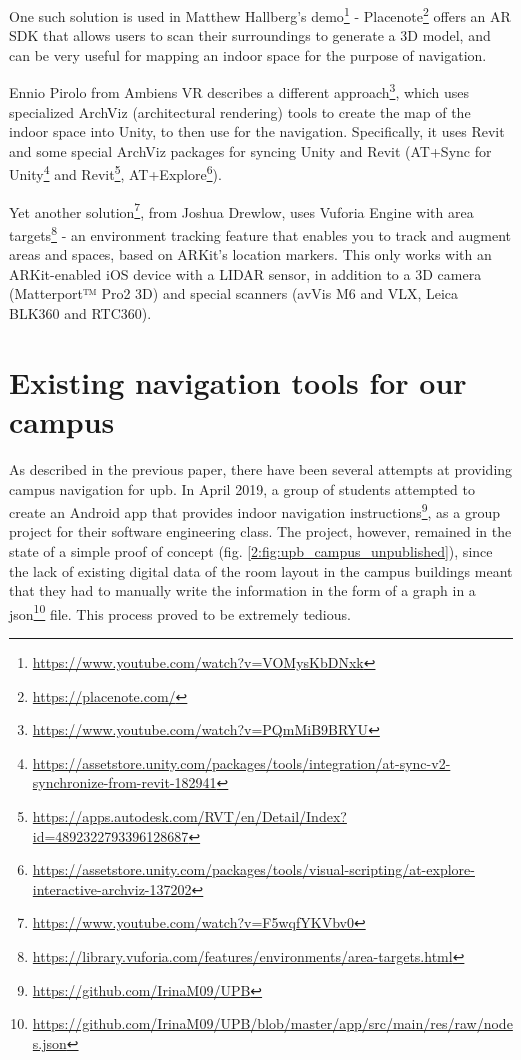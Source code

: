             One such solution is used in Matthew Hallberg's demo\footnote{\url{https://www.youtube.com/watch?v=VOMysKbDNxk}} - Placenote\footnote{\url{https://placenote.com/}}  offers an AR SDK that allows users to scan their surroundings to generate a 3D model, and can be very useful for mapping an indoor space for the purpose of navigation.

            Ennio Pirolo from Ambiens VR describes a different approach\footnote{\url{https://www.youtube.com/watch?v=PQmMiB9BRYU}}, which uses specialized ArchViz (architectural rendering) tools to create the map of the indoor space into Unity, to then use for the navigation. Specifically, it uses Revit and some special ArchViz packages for syncing Unity and Revit (AT+Sync for Unity\footnote{\url{https://assetstore.unity.com/packages/tools/integration/at-sync-v2-synchronize-from-revit-182941}} and Revit\footnote{\url{https://apps.autodesk.com/RVT/en/Detail/Index?id=4892322793396128687}}, AT+Explore\footnote{\url{https://assetstore.unity.com/packages/tools/visual-scripting/at-explore-interactive-archviz-137202}}).
            
            Yet another solution\footnote{\url{https://www.youtube.com/watch?v=F5wqfYKVbv0}}, from Joshua Drewlow, uses Vuforia Engine with area targets\footnote{\url{https://library.vuforia.com/features/environments/area-targets.html}} - an environment tracking feature that enables you to track and augment areas and spaces, based on ARKit’s location markers. This only works with an ARKit-enabled iOS device with a LIDAR sensor, in addition to a 3D camera (Matterport™ Pro2 3D) and special scanners (avVis M6 and VLX, Leica BLK360 and RTC360).

\section{Existing navigation tools for our campus} \label{2:existing_tools}

    As described in the previous paper\cite{alexandru2020acsupbmobile}, there have been several attempts at providing campus navigation for \acrlong{upb}. In April 2019, a group of students attempted to create an Android app that provides indoor navigation instructions\footnote{\url{https://github.com/IrinaM09/UPB}}, as a group project for their software engineering class. The project, however, remained in the state of a simple proof of concept (fig. \ref{2:fig:upb_campus_unpublished}), since the lack of existing digital data of the room layout in the campus buildings meant that they had to manually write the information in the form of a graph in a \gls{json}\footnote{\url{https://github.com/IrinaM09/UPB/blob/master/app/src/main/res/raw/nodes.json}} file. This process proved to be extremely tedious.
    
